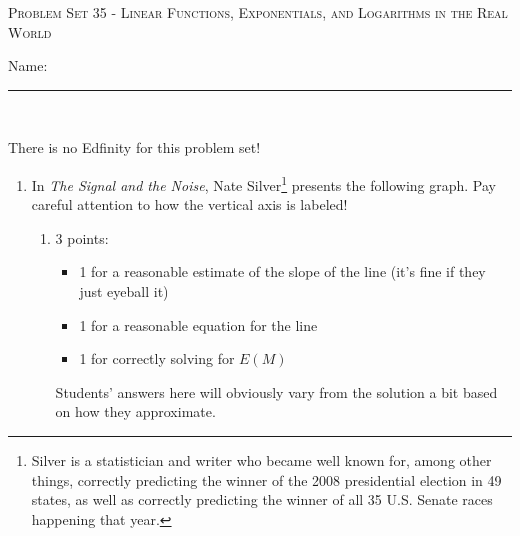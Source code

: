 \documentclass{article}
\begin{document}
\begin{center}
  \large\textsc{Problem Set 35 - Linear Functions, Exponentials, and Logarithms in the Real World}\vspace{.5in}\\
  \begin{problemonly}
   \large Name: \rule{5cm}{0.15mm}\\
   \end{problemonly}
\end{center}

There is no Edfinity for this problem set!

\begin{enumerate}
\item \label{earthquake-frequency}

  In \emph{The Signal and the Noise}, Nate Silver\footnote{Silver is a statistician and writer who became well known for, among other things, correctly predicting the winner of the 2008 presidential election in 49 states, as well as correctly predicting the winner of all 35 U.S. Senate races happening that year.} presents the following graph. Pay careful attention to how the vertical axis is labeled!


  \begin{enumerate}

  \item \label{earthquake-frequency-model}

    \begin{grading}
      3 points:
      \begin{itemize}[nosep]
      \item 1 for a reasonable estimate of the slope of the line (it's fine if they just eyeball it)
      \item 1 for a reasonable equation for the line
      \item 1 for correctly solving for $E(M)$
      \end{itemize}
      Students' answers here will obviously vary from the solution a bit based on how they approximate.
    \end{grading}


\end{enumerate}
\end{enumerate}
\end{document}
